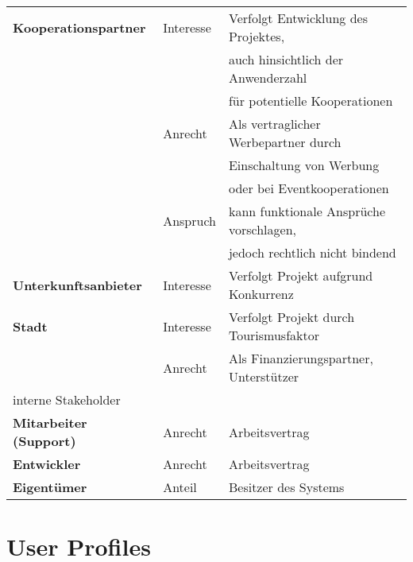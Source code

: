 \begin{table}[H]
\begin{tabular}{l l l}
\textbf{Kooperationspartner} & Interesse & Verfolgt Entwicklung des Projektes,\\[0.5ex]
                               & & auch hinsichtlich der Anwenderzahl\\[0.5ex]
                               & & für potentielle Kooperationen\\[1ex]

                     & Anrecht & Als vertraglicher Werbepartner durch \\[0.5ex]
                              & & Einschaltung von Werbung \\[0.5ex]
                              & & oder bei Eventkooperationen\\[1ex]
                      & Anspruch  & kann funktionale Ansprüche vorschlagen, \\[1ex]
                              & & jedoch rechtlich nicht bindend\\[1ex]


\textbf{Unterkunftsanbieter} & Interesse & Verfolgt Projekt aufgrund Konkurrenz \\[1ex]

\textbf{Stadt} & Interesse & Verfolgt Projekt durch Tourismusfaktor \\[1ex]
 & Anrecht & Als Finanzierungspartner, Unterstützer \\[1ex]

interne Stakeholder & &\\[1ex]
\textbf{Mitarbeiter (Support)} & Anrecht & Arbeitsvertrag \\[1ex]

\textbf{Entwickler} & Anrecht & Arbeitsvertrag \\[1ex]
\textbf{Eigentümer} & Anteil & Besitzer des Systems \\[1ex]

\hline
\end{tabular}
\label{tab:stakeholderidentifikation}
\end{table}


\section{User Profiles}


